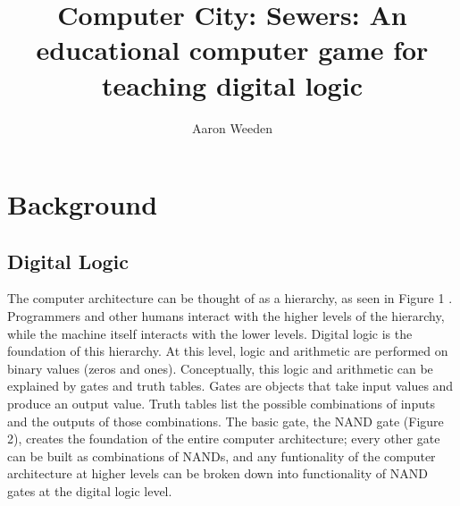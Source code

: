 \documentclass[12pt]{article}	%
\title{Computer City: Sewers:  An educational computer game for teaching digital logic}	%
\author{Aaron Weeden}					%
\begin{document}
\maketitle							%
\thispagestyle{empty}				%

\doublespacing						%

\tableofcontents

\section*{Background}

\subsection*{Digital Logic}
The computer architecture can be thought of as a hierarchy, as seen in Figure 1 \citep{Tanenbaum}.  Programmers and other humans interact with the higher levels of the hierarchy, while the machine itself interacts with the lower levels.  Digital logic is the foundation of this hierarchy.  At this level, logic and arithmetic are performed on binary values (zeros and ones).  Conceptually, this logic and arithmetic can be explained by gates and truth tables.  Gates are objects that take input values and produce an output value.  Truth tables list the possible combinations of inputs and the outputs of those combinations.  The basic gate, the NAND gate (Figure 2), creates the foundation of the entire computer architecture; every other gate can be built as combinations of NANDs, and any funtionality of the computer architecture at higher levels can be broken down into functionality of NAND gates at the digital logic level.
\end{document}
